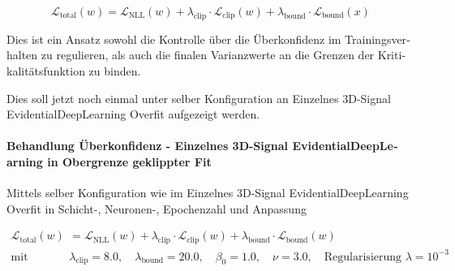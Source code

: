 \begin{otherlanguage}{ngerman}
\begin{equation}
\mathcal{L}_{\text{total}}(w) = \mathcal{L}_{\text{NLL}}(w) + \lambda_{\text{clip}} \cdot \mathcal{L}_{\text{clip}}(w) + \lambda_{\text{bound}} \cdot \mathcal{L}_{\text{bound}}(x)
\end{equation}

Dies ist ein Ansatz sowohl die Kontrolle über die Überkonfidenz im Trainingsverhalten zu regulieren, als auch die finalen Varianzwerte an die Grenzen der Kritikalitätsfunktion zu binden.

Dies soll jetzt noch einmal unter selber Konfiguration an \glqq{}Einzelnes 3D-Signal \gls{EvidentialDeepLearning} Overfit\grqq{} aufgezeigt werden.



\paragraph{Behandlung Überkonfidenz - \glqq{}Einzelnes 3D-Signal \gls{EvidentialDeepLearning} in Obergrenze geklippter Fit\grqq{}}

Mittels selber Konfiguration wie im \glqq{}Einzelnes 3D-Signal \gls{EvidentialDeepLearning} Overfit\grqq{} in Schicht-, Neuronen-, Epochenzahl und Anpassung 

\begin{align*}
\mathcal{L}_{\text{total}}(w) &= 
\mathcal{L}_{\text{NLL}}(w) 
+ \lambda_{\text{clip}} \cdot \mathcal{L}_{\text{clip}}(w) 
+ \lambda_{\text{bound}} \cdot \mathcal{L}_{\text{bound}}(w)
\\
\text{mit} \quad 
&\lambda_{\text{clip}} = 8.0, \quad 
\lambda_{\text{bound}} = 20.0, \quad 
\beta_0 = 1.0, \quad 
\nu = 3.0, \quad 
\text{Regularisierung } \lambda = 10^{-3}
\end{align*}


\end{otherlanguage}
